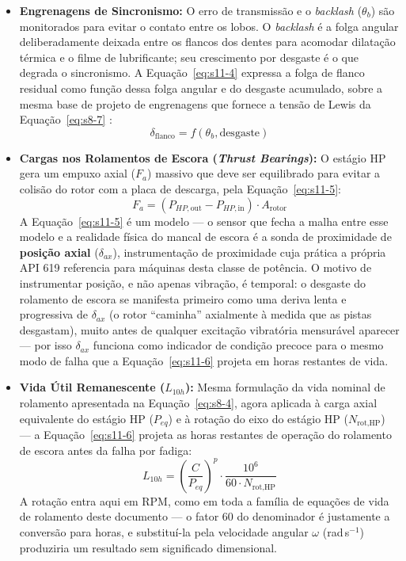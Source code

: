 \documentclass[12pt,a4paper]{article}
\numberwithin{equation}{section}
\numberwithin{table}{section}
\numberwithin{figure}{section}
\begin{document}
	\begin{itemize}
		\item \textbf{Engrenagens de Sincronismo:}
		O erro de transmissão e o \textit{backlash} ($\theta_b$) são monitorados para evitar o contato entre os lobos. O \textit{backlash} é a folga angular deliberadamente deixada entre os flancos dos dentes para acomodar dilatação térmica e o filme de lubrificante; seu crescimento por desgaste é o que degrada o sincronismo. A Equação~\eqref{eq:s11-4} expressa a folga de flanco residual como função dessa folga angular e do desgaste acumulado, sobre a mesma base de projeto de engrenagens que fornece a tensão de Lewis da Equação~\eqref{eq:s8-7} \cite[Cap.~13 e 14]{shigley}:
		\begin{equation}\label{eq:s11-4}
 \delta_{\text{flanco}} = f(\theta_b, \text{desgaste}) 
\end{equation}
		
		\item \textbf{Cargas nos Rolamentos de Escora (\textit{Thrust Bearings}):}
		O estágio HP gera um empuxo axial ($F_a$) massivo que deve ser equilibrado para evitar a colisão do rotor com a placa de descarga, pela Equação~\eqref{eq:s11-5}:
		\begin{equation}\label{eq:s11-5}
 F_a = (P_{HP,\text{out}} - P_{HP,\text{in}}) \cdot A_{\text{rotor}}
\end{equation}
		A Equação~\eqref{eq:s11-5} é um modelo — o sensor que fecha a malha entre esse modelo e a realidade física do mancal de escora é a sonda de proximidade de \textbf{posição axial} ($\delta_{ax}$), instrumentação de proximidade cuja prática a própria API 619 \cite{api619} referencia para máquinas desta classe de potência. O motivo de instrumentar posição, e não apenas vibração, é temporal: o desgaste do rolamento de escora se manifesta primeiro como uma deriva lenta e progressiva de $\delta_{ax}$ (o rotor ``caminha'' axialmente à medida que as pistas desgastam), muito antes de qualquer excitação vibratória mensurável aparecer — por isso $\delta_{ax}$ funciona como indicador de condição precoce para o mesmo modo de falha que a Equação~\eqref{eq:s11-6} projeta em horas restantes de vida.

		\item \textbf{Vida Útil Remanescente ($L_{10h}$):} Mesma formulação da vida nominal de rolamento apresentada na Equação~\eqref{eq:s8-4}, agora aplicada à carga axial equivalente do estágio HP ($P_{eq}$) e à rotação do eixo do estágio HP ($N_{\text{rot,HP}}$) — a Equação~\eqref{eq:s11-6} projeta as horas restantes de operação do rolamento de escora antes da falha por fadiga:
		\begin{equation}\label{eq:s11-6}
 L_{10h} = \left( \frac{C}{P_{eq}} \right)^p \cdot \frac{10^6}{60 \cdot N_{\text{rot,HP}}}
\end{equation}
		A rotação entra aqui em RPM, como em toda a família de equações de vida de rolamento deste documento — o fator $60$ do denominador é justamente a conversão para horas, e substituí-la pela velocidade angular $\omega$ (rad\,s$^{-1}$) produziria um resultado sem significado dimensional.
	\end{itemize}
	
\end{document}

